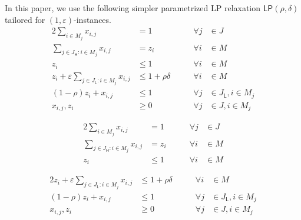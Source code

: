 \documentclass[11pt]{article}
\newcommand{\sfH}{{\mathsf H}}
\newcommand{\sfL}{{\mathsf L}}
\newcommand{\eps}{\varepsilon}
\renewcommand{\epsilon}{\varepsilon}
\newcommand{\LP}{{\mathsf{LP}}}
\renewcommand{\epsilon}{\varepsilon}
\begin{document}
In this paper, we use the following simpler parametrized LP relaxation $\LP(\rho,\delta)$ tailored for $(1,\eps)$-instances. 
\ifdefined\CR
\begin{alignat}{2}
\textstyle \sum_{i \in M_j}x_{i,j} &= 1 & \qquad \forall j &\in J  \label{CLP:job-covered}\\
\textstyle \sum_{j \in J_\sfH : i \in M_j}x_{i,j} &= z_i & \qquad \forall i &\in M \label{CLP:machine-big-job}\\
\textstyle z_i & \leq 1 & \qquad \forall i&\in M  \label{CLP:zi-atmost-1} \\
\textstyle z_i + \epsilon \sum_{j \in J_\sfL : i \in M_j} x_{i,j} &\leq 1 + \rho\delta &\qquad \forall i &\in M \label{CLP:machine-small-job}\\
(1-\rho) z_i + x_{i,j} &\leq 1 & \qquad \forall j &\in J_\sfL, i \in M_j \label{CLP:compact}\\
x_{i,j}, z_i &\geq 0 & \qquad \forall j &\in J, i \in M_j \nonumber
\end{alignat}
\else
\begin{minipage}{0.37\textwidth}
\begin{alignat}{2}
\textstyle \sum_{i \in M_j}x_{i,j} &= 1 & \qquad \forall j &\in J  \label{CLP:job-covered}\\
\textstyle \sum_{j \in J_\sfH : i \in M_j}x_{i,j} &= z_i & \qquad \forall i &\in M \label{CLP:machine-big-job}\\
\textstyle z_i & \leq 1 & \qquad \forall i&\in M \label{CLP:zi-atmost-1}
\end{alignat}
\end{minipage}
\begin{minipage}{0.58\textwidth}
\begin{alignat}{2}
\textstyle z_i + \epsilon \sum_{j \in J_\sfL : i \in M_j} x_{i,j} &\leq 1 + \rho\delta &\qquad \forall i &\in M \label{CLP:machine-small-job}\\
(1-\rho) z_i + x_{i,j} &\leq 1 & \qquad \forall j &\in J_\sfL, i \in M_j \label{CLP:compact}\\
x_{i,j}, z_i &\geq 0 & \qquad \forall j &\in J, i \in M_j \nonumber
\end{alignat}
\end{minipage}
\fi
\end{document}
